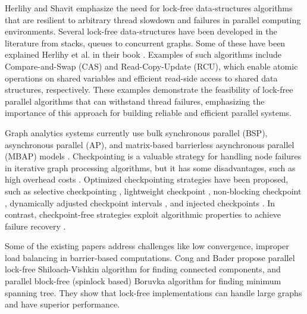Herlihy and Shavit \cite{Herlihy+:nature:opodis:2011} emphasize the need for lock-free data-structures algorithms that are resilient to arbitrary thread slowdown and failures in parallel computing environments. Several lock-free data-structures have been developed in the literature from stacks, queues to concurrent graphs. Some of these have been explained Herlihy et al. in their book \cite{Herlihy+:Art:Book:2020}. Examples of such algorithms include Compare-and-Swap (CAS) and Read-Copy-Update (RCU), which enable atomic operations on shared variables and efficient read-side access to shared data structures, respectively. These examples demonstrate the feasibility of lock-free parallel algorithms that can withstand thread failures, emphasizing the importance of this approach for building reliable and efficient parallel systems.

Graph analytics systems currently use bulk synchronous parallel (BSP), asynchronous parallel (AP), and matrix-based barrierless asynchronous parallel (MBAP) models \cite{graph-luo20}. Checkpointing is a valuable strategy for handling node failures in iterative graph processing algorithms, but it has some disadvantages, such as high overhead costs \cite{graph-xu16, graph-xu18, graph-yan16}. Optimized checkpointing strategies have been proposed, such as selective checkpointing \cite{graph-wang17}, lightweight checkpoint \cite{graph-yan16}, non-blocking checkpoint \cite{graph-xu16}, dynamically adjusted checkpoint intervals \cite{graph-wang17}, and injected checkpoints \cite{graph-xu16}. In contrast, checkpoint-free strategies exploit algorithmic properties to achieve failure recovery \cite{graph-xu18}.

Some of the existing papers \cite{yang2020graphabcd, sha2017technical, liu2019simd, yu2022toward} address challenges like low convergence, improper load balancing in barrier-based computations. Cong and Bader \cite{lock-cong05} propose parallel lock-free Shiloach-Vishkin algorithm for finding connected components, and parallel block-free (spinlock based) Boruvka algorithm for finding minimum spanning tree. They show that lock-free implementations can handle large graphs and have superior performance.







